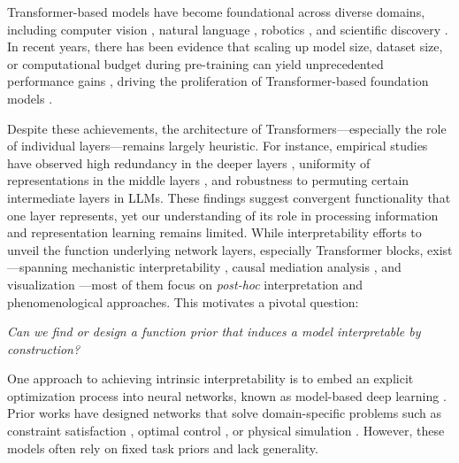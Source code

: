 Transformer-based models \citep{NIPS2017_3f5ee243} have become foundational across diverse domains, including computer vision \citep{dosovitskiy2021an,bao2022beit,he2022masked,peebles2023scalable}, natural language \citep{devlin-etal-2019-bert,Lan2020ALBERT, brown2020language}, robotics \citep{brohan2022rt,chen2021decision}, and scientific discovery \citep{jumper2021highly, kamienny2022end}. In recent years, there has been evidence that scaling up model size, dataset size, or computational budget during pre-training can yield unprecedented performance gains \citep{kaplan2020scalinglawsneurallanguage}, driving the proliferation of Transformer-based foundation models \citep{openai2024gpt4technicalreport,dubey2024llama,anil2023gemini,oquab2024dinov}. 

Despite these achievements, the architecture of Transformers—especially the role of individual layers—remains largely heuristic. For instance, empirical studies have observed high redundancy in the deeper layers \citep{gromov2025the,men-etal-2025-shortgpt}, uniformity of representations in the middle layers \citep{sun2025transformer}, and robustness to permuting certain intermediate layers \citep{lad2025remarkable} in LLMs. These findings suggest convergent functionality that one layer represents, yet our understanding of its role in processing information and representation learning remains limited. While interpretability efforts to unveil the function underlying network layers, especially Transformer blocks, exist---spanning mechanistic interpretability \citep{elhage2021mathematical,nanda2023progress,wang2023interpretability,huben2024sparse}, causal mediation analysis \citep{vig2020investigating,meng2022locating}, and visualization \citep{bricken2023monosemanticity,olsson2022context}---most of them focus on \emph{post-hoc} interpretation and phenomenological approaches. This motivates a pivotal question: 
\begin{tcolorbox}
[highlightquestion, boxrule=1pt]
    \centering
    \emph{Can we find or design a function prior that induces a model interpretable by construction?}
\end{tcolorbox}

One approach to achieving intrinsic interpretability is to embed an explicit optimization process into neural networks, known as model-based deep learning \citep{shlezinger2023model}. Prior works have designed networks that solve domain-specific problems such as constraint satisfaction \citep{wang2019satnet}, optimal control \citep{amos2017optnet, amos2018differentiable}, or physical simulation \citep{greydanus2019hamiltonian,karniadakis2021physics}. However, these models often rely on fixed task priors and lack generality.

